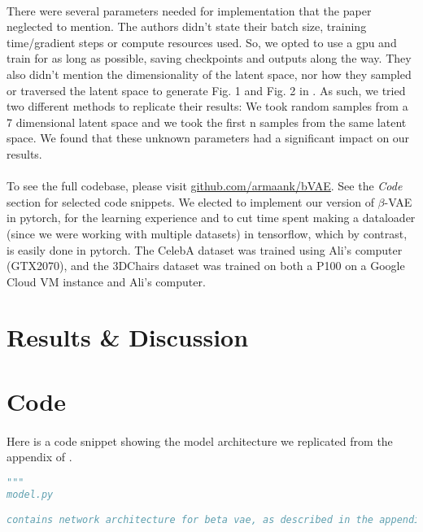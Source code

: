 \documentclass[justified,nobib]{tufte-handout}
\begin{document}
\begin{fullwidth}
\paragraph{} There were several parameters needed for implementation that the paper neglected to mention. The authors didn't state their batch size, training time/gradient steps or compute resources used. So, we opted to use a gpu and train for as long as possible, saving checkpoints and outputs along the way. They also didn't mention the dimensionality of the latent space, nor how they sampled or traversed the latent space to generate Fig. 1 and Fig. 2 in \citep{bvae}. As such, we tried two different methods to replicate their results: We took random samples from a 7 dimensional latent space and we took the first n samples from the same latent space. We found that these unknown parameters had a significant impact on our results. 


\paragraph{} To see the full codebase, please visit \underline{\href{https://github.com/armaank/bVAE}{github.com/armaank/bVAE}}. See the \textit{Code} section for selected code snippets. We elected to implement our version of $\beta$-VAE in pytorch, for the learning experience and to cut time spent making a dataloader (since we were working with multiple datasets) in tensorflow, which by contrast, is easily done in pytorch. The CelebA dataset was trained using Ali's computer (GTX2070), and the 3DChairs dataset was trained on both a P100 on a Google Cloud VM instance and Ali's computer. 
 
\clearpage
\section{Results \& Discussion}


\clearpage
\section{Code}
\paragraph{} Here is a code snippet showing the model architecture we replicated from the appendix of \cite{bvae}.
\begin{lstlisting}[language=Python]
"""
model.py

contains network architecture for beta vae, as described in the appendix of [2]


\end{lstlisting}
\end{fullwidth}
\end{document}
